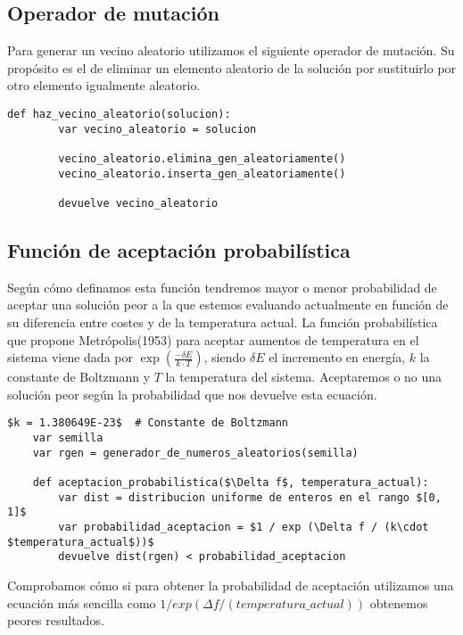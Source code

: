 \begin{minipage}{\textwidth}
	\subsection{Operador de mutación}
	
	Para generar un vecino aleatorio utilizamos el siguiente operador de mutación. Su propósito es el de eliminar un elemento aleatorio
	de la solución por sustituirlo por otro elemento igualmente aleatorio.

	\begin{lstlisting}[mathescape=true,caption={Operador de mutación para el algoritmo de Enfriamiento Simulado.},captionpos=b]
	def haz_vecino_aleatorio(solucion):
		var vecino_aleatorio = solucion

		vecino_aleatorio.elimina_gen_aleatoriamente()
		vecino_aleatorio.inserta_gen_aleatoriamente()

		devuelve vecino_aleatorio
	\end{lstlisting}
\end{minipage}

\begin{minipage}{\textwidth}
	\subsection{Función de aceptación probabilística}

	Según cómo definamos esta función tendremos mayor o menor probabilidad de aceptar una solución
	peor a la que estemos evaluando actualmente en función de su diferencia entre costes y de la temperatura
	actual. La función probabilística que propone Metrópolis(1953) para aceptar aumentos de temperatura
	en el sistema viene dada por $\exp (\frac{-\delta E}{k\cdot T})$, siendo $\delta E$ el incremento en energía,
	$k$ la constante de Boltzmann y $T$ la temperatura del sistema.\cite{Tema5MH} Aceptaremos o no una solución peor según la probabilidad
	que nos devuelve esta ecuación.

	\begin{lstlisting}[mathescape=true,caption={Función de aceptación probabilística para el algoritmo de Enfriamiento Simulado.},captionpos=b]
	$k = 1.380649E-23$	# Constante de Boltzmann
	var semilla
	var rgen = generador_de_numeros_aleatorios(semilla)
	
	def aceptacion_probabilistica($\Delta f$, temperatura_actual):
		var dist = distribucion uniforme de enteros en el rango $[0, 1]$
		var probabilidad_aceptacion = $1 / exp (\Delta f / (k\cdot $temperatura_actual$))$
		devuelve dist(rgen) < probabilidad_aceptacion
	\end{lstlisting}

	Comprobamos cómo si para obtener la probabilidad de aceptación utilizamos una ecuación
	más sencilla como $1 / exp (\Delta f / (temperatura\_actual))$ obtenemos peores resultados.
\end{minipage}

